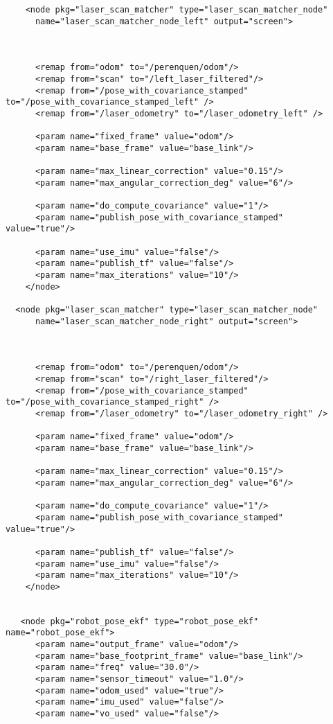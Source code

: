 \begin{center}
\begin{footnotesize}
\begin{verbatim}
    <node pkg="laser_scan_matcher" type="laser_scan_matcher_node"
      name="laser_scan_matcher_node_left" output="screen">
    


      <remap from="odom" to="/perenquen/odom"/>
      <remap from="scan" to="/left_laser_filtered"/>
      <remap from="/pose_with_covariance_stamped" to="/pose_with_covariance_stamped_left" />
      <remap from="/laser_odometry" to="/laser_odometry_left" />

      <param name="fixed_frame" value="odom"/>
      <param name="base_frame" value="base_link"/>

      <param name="max_linear_correction" value="0.15"/>
      <param name="max_angular_correction_deg" value="6"/>

      <param name="do_compute_covariance" value="1"/>
      <param name="publish_pose_with_covariance_stamped" value="true"/>

      <param name="use_imu" value="false"/>
      <param name="publish_tf" value="false"/>
      <param name="max_iterations" value="10"/>
    </node>

  <node pkg="laser_scan_matcher" type="laser_scan_matcher_node"
      name="laser_scan_matcher_node_right" output="screen">
    


      <remap from="odom" to="/perenquen/odom"/>
      <remap from="scan" to="/right_laser_filtered"/>
      <remap from="/pose_with_covariance_stamped" to="/pose_with_covariance_stamped_right" />
      <remap from="/laser_odometry" to="/laser_odometry_right" />

      <param name="fixed_frame" value="odom"/>
      <param name="base_frame" value="base_link"/>

      <param name="max_linear_correction" value="0.15"/>
      <param name="max_angular_correction_deg" value="6"/>

      <param name="do_compute_covariance" value="1"/>
      <param name="publish_pose_with_covariance_stamped" value="true"/>
      
      <param name="publish_tf" value="false"/>
      <param name="use_imu" value="false"/>
      <param name="max_iterations" value="10"/>
    </node>


   <node pkg="robot_pose_ekf" type="robot_pose_ekf" name="robot_pose_ekf">
      <param name="output_frame" value="odom"/>
      <param name="base_footprint_frame" value="base_link"/>
      <param name="freq" value="30.0"/>
      <param name="sensor_timeout" value="1.0"/>  
      <param name="odom_used" value="true"/>
      <param name="imu_used" value="false"/>
      <param name="vo_used" value="false"/>


\end{verbatim}
\end{footnotesize}
\end{center}
